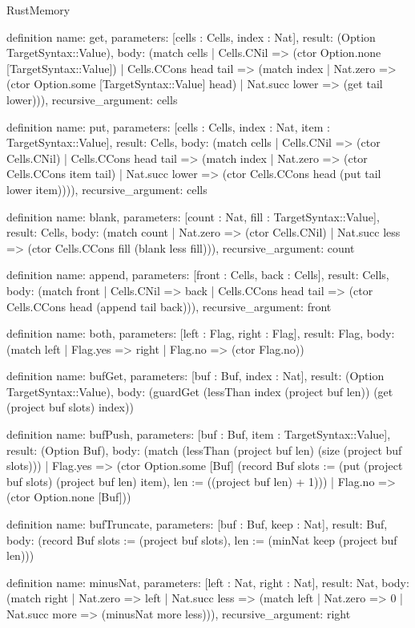 \begin{lexlean}{RustMemory}
\begin{semanticmodule}
definition{
  name: get,
  parameters: [cells : Cells, index : Nat],
  result: (Option TargetSyntax::Value),
  body: (match cells
    | Cells.CNil => (ctor Option.none [TargetSyntax::Value])
    | Cells.CCons head tail => (match index
      | Nat.zero => (ctor Option.some [TargetSyntax::Value] head)
      | Nat.succ lower => (get tail lower))),
  recursive_argument: cells
}

definition{
  name: put,
  parameters: [cells : Cells, index : Nat, item : TargetSyntax::Value],
  result: Cells,
  body: (match cells
    | Cells.CNil => (ctor Cells.CNil)
    | Cells.CCons head tail => (match index
      | Nat.zero => (ctor Cells.CCons item tail)
      | Nat.succ lower => (ctor Cells.CCons head (put tail lower item)))),
  recursive_argument: cells
}

definition{
  name: blank,
  parameters: [count : Nat, fill : TargetSyntax::Value],
  result: Cells,
  body: (match count
    | Nat.zero => (ctor Cells.CNil)
    | Nat.succ less => (ctor Cells.CCons fill (blank less fill))),
  recursive_argument: count
}

definition{
  name: append,
  parameters: [front : Cells, back : Cells],
  result: Cells,
  body: (match front
    | Cells.CNil => back
    | Cells.CCons head tail => (ctor Cells.CCons head (append tail back))),
  recursive_argument: front
}

definition{
  name: both,
  parameters: [left : Flag, right : Flag],
  result: Flag,
  body: (match left | Flag.yes => right | Flag.no => (ctor Flag.no))
}

definition{
  name: bufGet,
  parameters: [buf : Buf, index : Nat],
  result: (Option TargetSyntax::Value),
  body: (guardGet (lessThan index (project buf len)) (get (project buf slots) index))
}

definition{
  name: bufPush,
  parameters: [buf : Buf, item : TargetSyntax::Value],
  result: (Option Buf),
  body: (match (lessThan (project buf len) (size (project buf slots)))
    | Flag.yes => (ctor Option.some [Buf] (record Buf {slots := (put (project buf slots) (project buf len) item), len := ((project buf len) + 1)}))
    | Flag.no => (ctor Option.none [Buf]))
}

definition{
  name: bufTruncate,
  parameters: [buf : Buf, keep : Nat],
  result: Buf,
  body: (record Buf {slots := (project buf slots), len := (minNat keep (project buf len))})
}

definition{
  name: minusNat,
  parameters: [left : Nat, right : Nat],
  result: Nat,
  body: (match right
    | Nat.zero => left
    | Nat.succ less => (match left | Nat.zero => 0 | Nat.succ more => (minusNat more less))),
  recursive_argument: right
}


\end{semanticmodule}
\end{lexlean}
